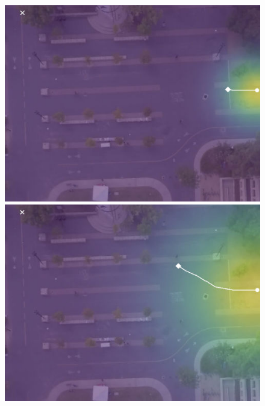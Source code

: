 \documentclass[letterpaper,10pt,conference]{ieeeconf}
\begin{document}
\begin{figure}
	\vspace{0.1cm}
	\begin{minipage}[c]{0.5cm}
	\end{minipage}
	\begin{minipage}[c]{0.3\linewidth}
		\includegraphics[width=\linewidth]{./figures/bookstore/rand_1_2_t=50.jpg}
	\end{minipage}
	\begin{minipage}[c]{0.3\linewidth}
		\includegraphics[width=\linewidth]{./figures/bookstore/rand_1_2_t=130.jpg}
	\end{minipage}
	\begin{minipage}[c]{0.3\linewidth}

\end{minipage}
\end{figure}
\end{document}
